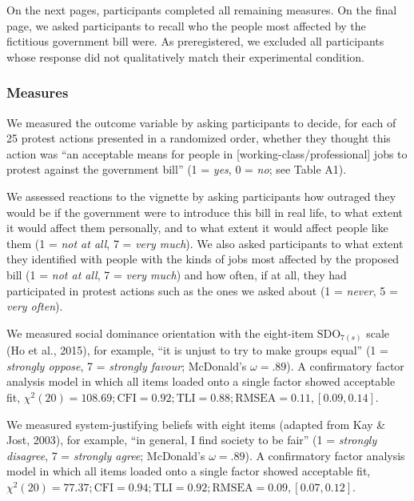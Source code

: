 \documentclass[12pt, letterpaper]{article}
\begin{document}
On the next pages, participants completed all remaining measures. On the
final page, we asked participants to recall who the people most affected
by the fictitious government bill were. As preregistered, we excluded
all participants whose response did not qualitatively match their
experimental condition.

\hypertarget{measures}{%
\subsubsection{Measures}\label{measures}}

We measured the outcome variable by asking participants to decide, for
each of 25 protest actions presented in a randomized order, whether they
thought this action was ``an acceptable means for people in
{[}working-class/professional{]} jobs to protest against the government
bill'' (1 = \emph{yes}, 0 = \emph{no}; see Table A1).

We assessed reactions to the vignette by asking participants how
outraged they would be if the government were to introduce this bill in
real life, to what extent it would affect them personally, and to what
extent it would affect people like them (1 = \emph{not at all}, 7 =
\emph{very much}). We also asked participants to what extent they
identified with people with the kinds of jobs most affected by the
proposed bill (1 = \emph{not at all}, 7 = \emph{very much}) and how
often, if at all, they had participated in protest actions such as the
ones we asked about (1 = \emph{never}, 5 = \emph{very often}).

We measured social dominance orientation with the eight-item
\(\text{SDO}_{7(s)}\) scale (Ho et al., 2015), for example, ``it is
unjust to try to make groups equal'' (1 = \emph{strongly oppose}, 7 =
\emph{strongly favour}; McDonald's \(\omega = .89\)). A confirmatory
factor analysis model in which all items loaded onto a single factor
showed acceptable fit,
\(\chi^2 (20) = 108.69; \text{CFI} = 0.92; \text{TLI} = 0.88; \text{RMSEA} = 0.11, [0.09, 0.14]\).

We measured system-justifying beliefs with eight items (adapted from Kay
\& Jost, 2003), for example, ``in general, I find society to be fair''
(1 = \emph{strongly disagree}, 7 = \emph{strongly agree}; McDonald's
\(\omega = .89\)). A confirmatory factor analysis model in which all
items loaded onto a single factor showed acceptable fit,
\(\chi^2 (20) = 77.37; \text{CFI} = 0.94; \text{TLI} = 0.92; \text{RMSEA} = 0.09, [0.07, 0.12]\).
\end{document}
